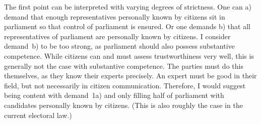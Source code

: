 The first point can be interpreted with varying degrees of strictness. One can a) demand that
enough representatives personally known by citizens sit in parliament so that control of
parliament is ensured. Or one demands b) that all representatives of parliament are
personally known by citizens. I consider demand~b) to be too strong, as parliament should also
possess substantive competence. While citizens can and must assess trustworthiness very well,
this is generally not the case with substantive competence. The parties must
do this themselves, as they know their experts precisely. An expert must be good in their field,
but not necessarily in citizen communication. Therefore, I would suggest being content with
demand~1a) and only filling half of parliament with candidates personally known by citizens.
(This is also roughly the case in the current electoral law.)

